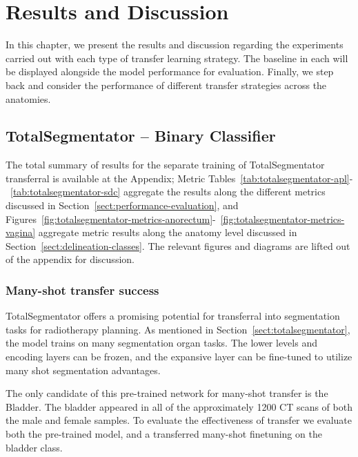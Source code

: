 \documentclass[11pt,twoside]{report}
\begin{document}
\chapter{Results and Discussion}\label{sect:results}\label{sect:discussion}

In this chapter, we present the results and discussion regarding the experiments carried out with each type of transfer learning strategy. The baseline in each will be displayed alongside the model performance for evaluation. Finally, we step back and consider the performance of different transfer strategies across the anatomies.

\section{TotalSegmentator -- Binary Classifier}

The total summary of results for the separate training of TotalSegmentator transferral is available at the Appendix; Metric Tables~\ref{tab:totalsegmentator-apl}-~\ref{tab:totalsegmentator-sdc} aggregate the results along the different metrics discussed in Section~\ref{sect:performance-evaluation}, and Figures~\ref{fig:totalsegmentator-metrics-anorectum}-~\ref{fig:totalsegmentator-metrics-vagina} aggregate metric results along the anatomy level discussed in Section~\ref{sect:delineation-classes}. The relevant figures and diagrams are lifted out of the appendix for discussion.


\subsection{Many-shot transfer success}\label{sec:totalsegmentator-many-shot-transfer-success}

TotalSegmentator offers a promising potential for transferral into segmentation tasks for radiotherapy planning. As mentioned in Section~\ref{sect:totalsegmentator}, the model trains on many segmentation organ tasks. The lower levels and encoding layers can be frozen, and the expansive layer can be fine-tuned to utilize many shot segmentation advantages. 

The only candidate of this pre-trained network for many-shot transfer is the Bladder. The bladder appeared in all of the approximately 1200 CT scans of both the male and female samples. To evaluate the effectiveness of transfer we evaluate both the pre-trained model, and a transferred many-shot finetuning on the bladder class.
\end{document}
